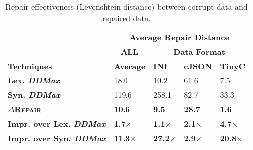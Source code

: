 \documentclass[acmsmall,screen,review,anonymous]{acmart}
\newcommand{\approach}{\textsc{$\Delta$Repair}\xspace}
\newcommand{\ddmax}{\textit{DDMax}\xspace}
\begin{document}

\begin{table}[!tbp]
\caption{Repair effectiveness (Levenshtein distance) between corrupt data and repaired data.}
\begin{tabular}{|p{4.0cm}|p{1.5cm}|p{1.5cm}|p{1.5cm}|p{1.5cm}|}
\hline
 &  \multicolumn{4}{c|}{\textbf{Average Repair Distance}}  \\
&  \multicolumn{1}{c|}{\textbf{ALL}} &   \multicolumn{3}{c|}{\textbf{Data Format}}  \\
\textbf{Techniques} & \textbf{Average}  & \textbf{INI} & \textbf{cJSON} & \textbf{TinyC} \\
\hline
\textbf{Lex. \ddmax} & 18.0 & {10.2} &  61.6 &  7.5 \\
\textbf{Syn. \ddmax} & 119.6 &  258.1 & 82.7 &  33.3 \\
\hline
\textbf{\approach} & \textbf{10.6}  & \textbf{9.5} &  \textbf{28.7} & \textbf{1.6} \\
\hline
\textbf{Impr. over Lex. \ddmax} & \textbf{1.7$\times$} & \textbf{1.1$\times$} & \textbf{2.1$\times$} & \textbf{4.7$\times$} \\
\textbf{Impr. over Syn. \ddmax} & \textbf{11.3$\times$} & \textbf{27.2$\times$} & \textbf{2.9$\times$} & \textbf{20.8$\times$} \\
\hline
\end{tabular}
\label{tab:datarepairquality}
\end{table}
\end{document}
